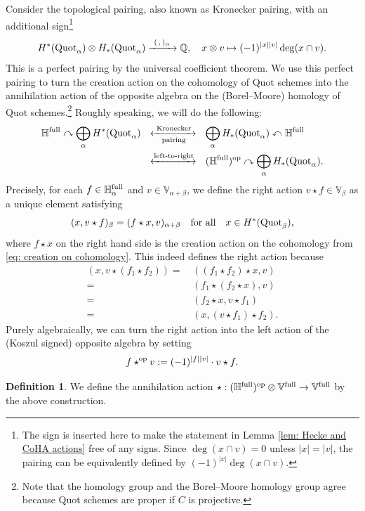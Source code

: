 \documentclass[10pt]{amsart}
\newcommand{\BQ}{\mathbb{Q}}
\newcommand{\BH}{\mathbb{H}}
\newcommand{\BV}{\mathbb{V}}
\newcommand{\Quot}{\textnormal{Quot}}
\newcommand{\op}{\textnormal{op}}
\newcommand{\+}{{}^+}
\newcommand{\full}{\textnormal{full}}
\theoremstyle{definition}
\theoremstyle {definition}
\theoremstyle {definition}
\newtheorem{definition}[theorem]{Definition}
\begin{document}
Consider the topological pairing, also known as Kronecker pairing, with an additional sign\footnote{The sign is inserted here to make the statement in Lemma \ref{lem: Hecke and CoHA actions} free of any signs. Since $\deg(x\cap v)=0$ unless $|x|=|v|$, the pairing can be equivalently defined by $(-1)^{|x|}\deg(x\cap v)$.}
$$H^*(\Quot_\alpha)\otimes H_*(\Quot_\alpha)\xrightarrow{\ (\,,\,)_\alpha\ }\BQ,\quad x\otimes v\mapsto (-1)^{|x||v|}\deg(x\cap v). 
$$
This is a perfect pairing by the universal coefficient theorem. We use this perfect pairing to turn the creation action on the cohomology of Quot schemes into the annihilation action of the opposite algebra on the (Borel--Moore) homology of Quot schemes.\footnote{Note that the homology group and the Borel--Moore homology group agree because Quot schemes are proper if $C$ is projective.} Roughly speaking, we will do the following:
\begin{align*}
    \displaystyle\BH^\full\curvearrowright \bigoplus_\alpha H^*(\Quot_\alpha)
    &\ \ \xleftrightarrow[\textnormal{pairing}]{\textnormal{\ Kronecker\ }}\ \ 
    \displaystyle \bigoplus_\alpha H_*(\Quot_\alpha)\curvearrowleft \BH^\full\\
    &\ \ \xleftrightarrow{\textnormal{left-to-right}}\ \ 
    \displaystyle(\BH^\full)^\op\curvearrowright \bigoplus_\alpha H_*(\Quot_\alpha). 
\end{align*}
Precisely, for each $f\in \BH^\full_\alpha$ and $v\in \BV_{\alpha+\beta}$, we define the right action $v\star f\in \BV_\beta$ as a unique element satisfying 
$$(x,v\star f)_\beta=(f\star x,v)_{\alpha+\beta}\quad \textnormal{for all}\quad x\in H^*(\Quot_\beta),
$$
where $f\star x$ on the right hand side is the creation action on the cohomology from \eqref{eq: creation on cohomology}. This indeed defines the right action because 
\begin{align*}
    (x,v\star(f_1\star f_2))=&\,((f_1\star f_2)\star x, v)\\
    =&\,(f_1\star (f_2\star x),v)\\
    =&\,(f_2\star x,v\star f_1)\\
    =&\,(x,(v\star f_1)\star f_2). 
\end{align*}
Purely algebraically, we can turn the right action into the left action of the (Koszul signed) opposite algebra by setting 
$$f\star^{\op}v:=(-1)^{|f||v|}\cdot v\star f. 
$$

\begin{definition}\label{def: annihilation}
We define the annihilation action $\star:(\BH^\full)^\op\otimes \BV^\full\rightarrow \BV^\full$ by the above construction. 
\end{definition}
\end{document}
